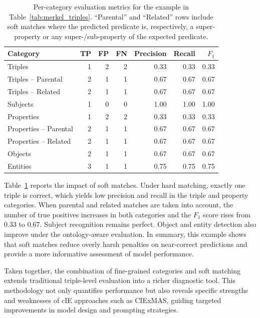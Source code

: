 \documentclass[a4paper,oneside,bibliography=totoc]{scrbook}
\begin{document}
\begin{table}[ht]
  \centering
  \label{tab:merkel_metrics}
  \begin{tabular}{lrrrrrr}
    \toprule
    Category               & TP & FP & FN & Precision & Recall & $F_1$ \\ \midrule
    Triples                & 1  & 2  & 2  & 0.33      & 0.33   & 0.33  \\
    Triples -- Parental    & 2  & 1  & 1  & 0.67      & 0.67   & 0.67  \\
    Triples -- Related     & 2  & 1  & 1  & 0.67      & 0.67   & 0.67  \\
    Subjects               & 1  & 0  & 0  & 1.00      & 1.00   & 1.00  \\
    Properties             & 1  & 2  & 2  & 0.33      & 0.33   & 0.33  \\
    Properties -- Parental & 2  & 1  & 1  & 0.67      & 0.67   & 0.67  \\
    Properties -- Related  & 2  & 1  & 1  & 0.67      & 0.67   & 0.67  \\
    Objects                & 2  & 1  & 1  & 0.67      & 0.67   & 0.67  \\
    Entities               & 3  & 1  & 1  & 0.75      & 0.75   & 0.75  \\
    \bottomrule
  \end{tabular}
  \caption{Per-category evaluation metrics for the example in Table~\ref{tab:merkel_triples}. ``Parental'' and ``Related'' rows include soft matches where the predicted predicate is, respectively, a super-property or any super-/sub-property of the expected predicate.}
\end{table}

Table~\ref{tab:merkel_metrics} reports the impact of soft matches. Under hard matching, exactly one triple is correct, which yields low precision and recall in the triple and property categories. When parental and related matches are taken into account, the number of true positives increases in both categories and the $F_1$ score rises from $0.33$ to $0.67$. Subject recognition remains perfect. Object and entity detection also improve under the ontology-aware evaluation. In summary, this example shows that soft matches reduce overly harsh penalties on near-correct predictions and provide a more informative assessment of model performance.

Taken together, the combination of fine-grained categories and soft matching extends traditional triple-level evaluation into a richer diagnostic tool. This methodology not only quantifies performance but also reveals specific strengths and weaknesses of \ac{cIE} approaches such as CIExMAS, guiding targeted improvements in model design and prompting strategies.
\end{document}
